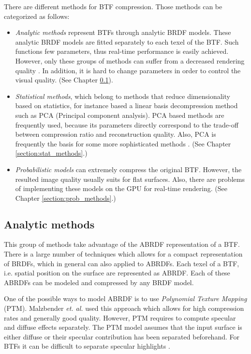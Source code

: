 There are different methods for BTF compression. Those methods can be categorized as follows:

\begin{itemize}
  \item \emph{Analytic methods} represent BTFs through analytic BRDF models. 
These analytic BRDF models are fitted separately to each texel of the BTF. Such functions  few parameters, thus real-time performance is easily achieved.
However, only these groups of methods can suffer from a decreased rendering quality \cite{haindl}. In addition, it is hard to change parameters in order to control the visual quality. (See Chapter  \ref{section:analytic_methods}).
   \item \emph{Statistical methods}, which belong to methods that reduce dimensionality based on  statistics, for instance based a linear basis decompression method such as PCA (Principal component analysis). 
    PCA based methods are frequently used, because its parameters directly correspond to the trade-off between compression ratio and reconstruction quality.
    Also, PCA is frequently the basis for some more sophisticated methods \cite{webglbtfstreaming}. (See Chapter \ref{section:stat_methods}.)
   \item \emph{Probabilistic models} can extremely compress the original BTF.
   However, the resulted image quality usually suits for flat surfaces. 
   Also, there are problems of implementing these models on the GPU for real-time rendering. (See Chapter \ref{section:prob_methods}.)
 \end{itemize}



 \subsection{Analytic methods}
\label{section:analytic_methods}	
 This group of methods take advantage of the ABRDF representation of a BTF. 
 There is a large number of techniques which allows for a compact representation of BRDFs, which in general can also applied to ABRDFs.
 Each texel of a BTF, i.e. spatial position on the surface are represented as ABRDF. Each of these ABRDFs can be modeled and compressed by any BRDF model.
 
One of the possible ways to model ABRDF is to use \emph{Polynomial Texture  Mapping} (PTM).
Malzbender  \emph{et. al.} \cite{PTM} used this approach which allows for high compression rates and generally good quality. 
However, PTM requires to compute specular and diffuse effects separately. 
The PTM model assumes that the input surface is either diffuse or their specular contribution has been separated beforehand.
For BTFs it can be difficult to separate specular highlights \cite{haindl}.

